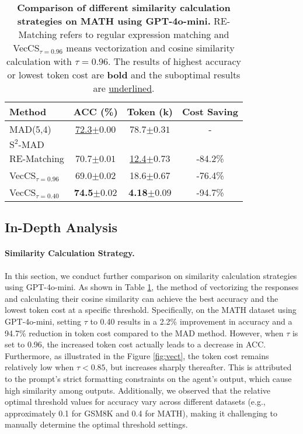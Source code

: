 \begin{table}[h]
  \centering
  \setlength\tabcolsep{1.5 pt}
  \begin{tabular}{lccc}
    \toprule
    \textbf{Method} & \textbf{ACC (\%)} & \textbf{Token (k)} & \textbf{Cost Saving}\\ 
    \midrule
    MAD(5,4) & \underline{72.3}\scriptsize{$\pm 0.00$} & 78.7\scriptsize{$\pm 0.31$} & - \\
    \midrule
    \({\text{S}^2\text{-MAD}}\) & &\\
    \midrule
    RE-Matching & 70.7\scriptsize{$\pm 0.01$} & \underline{12.4}\scriptsize{$\pm 0.73$} & -84.2\%\\
    VecCS$_{\tau = 0.96}$ & 69.0\scriptsize{$\pm 0.02$} & 18.6\scriptsize{$\pm 0.67$} & -76.4\%\\
    VecCS$_{\tau = 0.40}$ & \textbf{74.5}\scriptsize{$\pm 0.02$} & \textbf{4.18}\scriptsize{$\pm 0.09$} & -94.7\%\\
    \bottomrule
    
  \end{tabular}
  \caption{\textbf{Comparison of different similarity calculation strategies on MATH using GPT-4o-mini.} RE-Matching refers to regular expression matching and VecCS$_{\tau = 0.96}$ means vectorization and cosine similarity calculation with $\tau = 0.96$. The results of highest accuracy or lowest token cost are \textbf{bold} and the suboptimal results are \underline{underlined}.}
  \label{tab:comparison_similarity}
\end{table}
\subsection{In-Depth Analysis} 
\label{sec:in-depth-analysis}

\paragraph{Similarity Calculation Strategy.} In this section, we conduct further comparison on similarity calculation strategies using GPT-4o-mini. As shown in Table \ref{tab:comparison_similarity}, the method of vectorizing the responses and calculating their cosine similarity can achieve the best accuracy and the lowest token cost at a specific threshold. Specifically, on the MATH dataset using GPT-4o-mini, setting $\tau$ to 0.40 results in a 2.2\% improvement in accuracy and a 94.7\% reduction in token cost compared to the MAD method. However, when $\tau$ is set to 0.96, the increased token cost actually leads to a decrease in ACC. Furthermore, as illustrated in the Figure \ref{fig:vect}, the token cost remains relatively low when $\tau < 0.85$, but increases sharply thereafter. This is attributed to the prompt's strict formatting constraints on the agent's output, which cause high similarity among outputs. Additionally, we observed that the relative optimal threshold values for accuracy vary across different datasets (e.g., approximately 0.1 for GSM8K and 0.4 for MATH), making it challenging to manually determine the optimal threshold settings.



